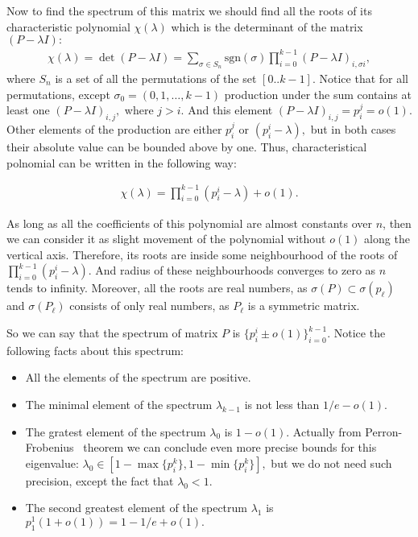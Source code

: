 \documentclass{article}
\begin{document}
Now to find the spectrum of this matrix we should find all the roots of its characteristic polynomial $\chi(\lambda)$ which is the determinant of the matrix $(P - \lambda I):$
\begin{align*}
  \chi(\lambda) = \det (P - \lambda I) = \sum\limits_{\sigma \in S_n} \text{sgn}(\sigma) \prod\limits_{i = 0}^{k - 1}(P - \lambda I)_{i, \sigma{i}},
\end{align*}
where $S_n$ is a set of all the permutations of the set $[0..k - 1].$ Notice that for all permutations, except $\sigma_0 = (0, 1, \dots, k - 1)$ production under the sum contains at least one $(P - \lambda I)_{i, j},$ where $j > i$. And this element $(P - \lambda I)_{i, j} = p_i^j = o(1)$. Other elements of the production are either $p_i^j$ or $(p_i^i - \lambda),$ but in both cases their absolute value can be bounded above by one. Thus, characteristical polnomial can be written in the following way:

\begin{align*}
  \chi(\lambda) = \prod\limits_{i = 0}^{k - 1} (p_i^i - \lambda) + o(1).
\end{align*}

As long as all the coefficients of this polynomial are almost constants over $n$, then we can consider it as slight movement of the polynomial without $o(1)$ along the vertical axis. Therefore, its roots are inside some neighbourhood of the roots of $\prod\limits_{i = 0}^{k - 1} (p_i^i - \lambda).$ And radius of these neighbourhoods converges to zero as $n$ tends to infinity. Moreover, all the roots are real numbers, as $\sigma(P) \subset \sigma(p_\ell)$ and $\sigma(P_\ell)$ consists of only real numbers, as $P_\ell$ is a symmetric matrix.

So we can say that the spectrum of matrix $P$ is $\{p_i^i \pm o(1)\}_{i = 0}^{k - 1}.$ Notice the following facts about this spectrum:
\begin{itemize}
\item All the elements of the spectrum are positive.
\item The minimal element of the spectrum $\lambda_{k - 1}$ is not less than $1/e - o(1).$
\item The gratest element of the spectrum $\lambda_0$ is $1 - o(1).$ Actually from Perron-Frobenius~\cite{} theorem we can conclude even more precise bounds for this eigenvalue: $\lambda_0 \in [1 - \max\{p_i^k\}, 1 - \min\{p_i^k\}],$ but we do not need such precision, except the fact that $\lambda_0 < 1.$
\item The second greatest element of the spectrum $\lambda_1$ is $p_1^1 (1 + o(1)) = 1 - 1/e + o(1).$
\end{itemize}
\end{document}
